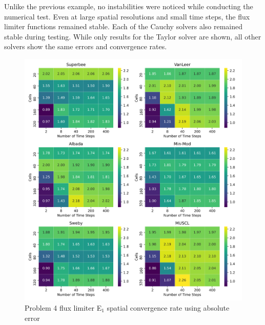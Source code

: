 Unlike the previous example, no instabilities were noticed while conducting the numerical test. Even at large spatial resolutions and small time steps, the flux limiter functions remained stable. Each of the Cauchy solvers also remained stable during testing. While only results for the Taylor solver are shown, all other solvers show the same errors and convergence rates.

\clearpage

\begin{figure}[p]
    \centering
    \includegraphics[width=6in]{images/chapter-5/progressionProblems/problem4/problem4E1FluxLimiterConvergenceRate.png}
    \caption{Problem 4 flux limiter E${}_{1}$ spatial convergence rate using absolute error}
    \label{fig:problem4_l1error_fluxlimiter_convergence_rate}
\end{figure}

\clearpage

